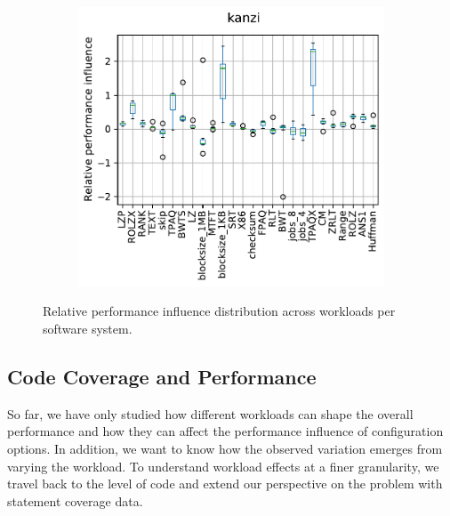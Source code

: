 \begin{figure}
\begin{minipage}{0.33\textwidth}
\begin{subfigure}{\linewidth}
		\end{subfigure}
	\end{minipage}
	\begin{minipage}{0.33\textwidth}
		\begin{subfigure}{\linewidth}
			\includegraphics[width=\linewidth]{images/rq2/relative_performance_kanzi.pdf}
			\vspace{1.19cm}
		\end{subfigure}
	\end{minipage}
	\caption{Relative performance influence distribution across workloads per software system.}
	\label{fig:feature_influence_actross_workloads}
\end{figure}

\vspace{1em}


\subsection{Code Coverage and Performance}\label{sec:rq3}
So far, we have only studied how different workloads can shape the overall performance and how they can affect the performance influence of configuration options. In addition, we want to know how the observed variation emerges from  varying the workload. To understand workload effects at a finer granularity, we travel back to the level of code and extend our perspective on the problem with statement coverage data. 

